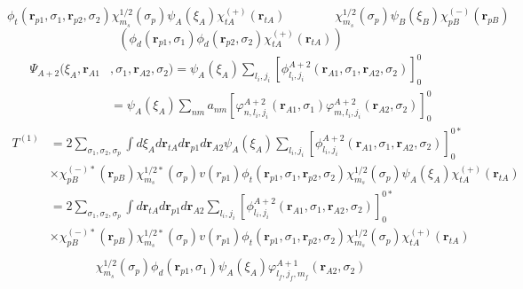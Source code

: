 \documentclass[a4paper,11pt]{book}
\numberwithin{equation}{section}
\numberwithin{figure}{section}
\numberwithin{table}{section}
\begin{document}
\begin{equation*}
\phi_t(\mathbf{r}_{p1},\sigma_1,\mathbf{r}_{p2},\sigma_2)\chi^{1/2}_{m_s}(\sigma_p)\psi_A(\xi_A)\chi^{(+)}_{tA}(\mathbf{r}_{tA})\quad\quad\quad\quad \chi^{1/2}_{m_s}(\sigma_p)\psi_B(\xi_B)\chi^{(-)}_{pB}(\mathbf{r}_{pB})
\end{equation*}
\begin{equation*}
\left(\phi_d(\mathbf{r}_{p1},\sigma_1)\phi_d(\mathbf{r}_{p2},\sigma_2)\chi^{(+)}_{tA}(\mathbf{r}_{tA})\right)
\end{equation*}
\begin{equation*}
\begin{split}
\Psi_{A+2}(\xi_A,\mathbf r_{A1}&,\sigma_1,\mathbf r_{A2},\sigma_2)=\psi_A(\xi_A)\sum_{l_i,j_i}[\phi^{A+2}_{l_i,j_i}(\mathbf r_{A1},\sigma_1,\mathbf r_{A2},\sigma_2)]^0_0\\
&=\psi_A(\xi_A)\sum_{nm}a_{nm}\left[\varphi^{A+2}_{n,l_i,j_i}(\mathbf r_{A1},\sigma_1)\varphi^{A+2}_{m,l_i,j_i}(\mathbf r_{A2},\sigma_2)\right]^0_0
\end{split}
\end{equation*} 
\begin{equation*}
\begin{split}
T^{(1)}&=2\sum_{\sigma_1,\sigma_2,\sigma_p}\int d\xi_A d\mathbf{r}_{tA} d\mathbf{r}_{p1}d\mathbf{r}_{A2} \psi_A(\xi_A)\sum_{l_i,j_i}[\phi^{A+2}_{l_i,j_i}(\mathbf r_{A1},\sigma_1,\mathbf r_{A2},\sigma_2)]^{0*}_{0}\\
&\times\chi^{(-)*}_{pB}(\mathbf{r}_{pB})\chi^{1/2*}_{m_s}(\sigma_p)
 v(r_{p1}) \phi_t(\mathbf{r}_{p1},\sigma_1,\mathbf{r}_{p2},\sigma_2)\chi^{1/2}_{m_s}(\sigma_p)\psi_A(\xi_A)\chi^{(+)}_{tA}(\mathbf{r}_{tA})\\
 &=2\sum_{\sigma_1,\sigma_2,\sigma_p}\int d\mathbf{r}_{tA} d\mathbf{r}_{p1}d\mathbf{r}_{A2} \sum_{l_i,j_i}[\phi^{A+2}_{l_i,j_i}(\mathbf r_{A1},\sigma_1,\mathbf r_{A2},\sigma_2)]^{0*}_{0}\\
 &\times\chi^{(-)*}_{pB}(\mathbf{r}_{pB})\chi^{1/2*}_{m_s}(\sigma_p)
  v(r_{p1}) \phi_t(\mathbf{r}_{p1},\sigma_1,\mathbf{r}_{p2},\sigma_2)\chi^{1/2}_{m_s}(\sigma_p)\chi^{(+)}_{tA}(\mathbf{r}_{tA})\\
\end{split}
\end{equation*} 
\newpage
\begin{equation*}
\begin{split}
\chi^{1/2}_{m_s}(\sigma_p)\phi_d(\mathbf{r}_{p1},\sigma_1)\psi_A(\xi_A)\varphi^{A+1}_{l_f,j_f,m_f}(\mathbf r_{A2},\sigma_2)
\end{split}
\end{equation*} 
\end{document}
